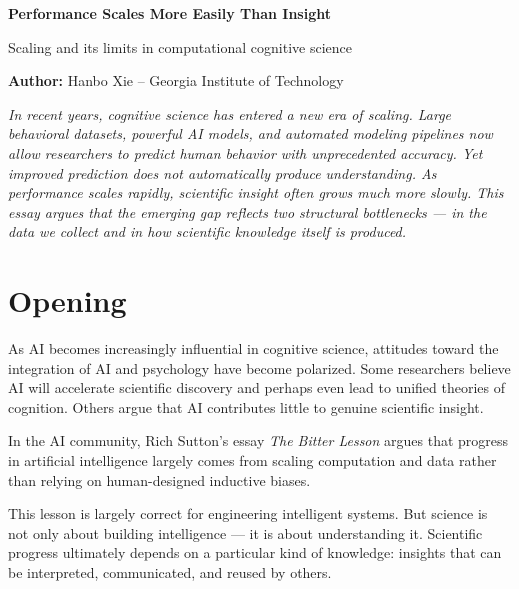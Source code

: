 \documentclass[11pt]{article}
\begin{document}
{\LARGE \textbf{Performance Scales More Easily Than Insight}}

\vspace{0.3em}

{\large Scaling and its limits in computational cognitive science}

\vspace{1em}

\textbf{Author:} Hanbo Xie -- Georgia Institute of Technology

\vspace{1.5em}


\begin{center}
\begin{minipage}{0.9\textwidth}
\small
\textit{
In recent years, cognitive science has entered a new era of scaling. Large behavioral datasets, powerful AI models, and automated modeling pipelines now allow researchers to predict human behavior with unprecedented accuracy. Yet improved prediction does not automatically produce understanding. As performance scales rapidly, scientific insight often grows much more slowly. This essay argues that the emerging gap reflects two structural bottlenecks — in the data we collect and in how scientific knowledge itself is produced.
}
\end{minipage}
\end{center}

\vspace{2em}


\section*{Opening}

As AI becomes increasingly influential in cognitive science, attitudes toward the integration of AI and psychology have become polarized. Some researchers believe AI will accelerate scientific discovery and perhaps even lead to unified theories of cognition. Others argue that AI contributes little to genuine scientific insight.

In the AI community, Rich Sutton’s essay \textit{The Bitter Lesson} argues that progress in artificial intelligence largely comes from scaling computation and data rather than relying on human-designed inductive biases.

This lesson is largely correct for engineering intelligent systems. But science is not only about building intelligence — it is about understanding it. Scientific progress ultimately depends on a particular kind of knowledge: insights that can be interpreted, communicated, and reused by others.
\end{document}
